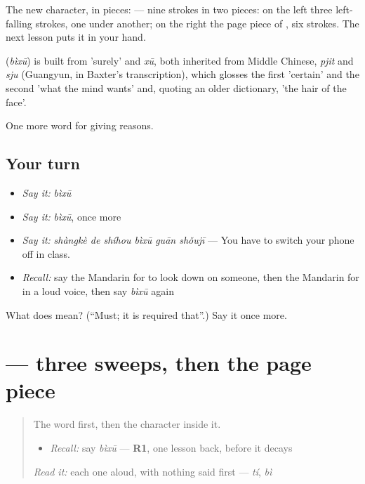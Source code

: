 The new character, in pieces:  — nine strokes in two pieces: on the left three left-falling strokes, one under another; on the right the page piece of , six strokes. The next lesson puts it in your hand.

\begin{cousinweb}
\textbf{} (\emph{bìxū}) is built from  'surely' and \emph{xū}, both inherited from Middle Chinese, \emph{pjit} and \emph{sju} (Guangyun, in Baxter's transcription), which glosses the first 'certain' and the second 'what the mind wants' and, quoting an older dictionary, 'the hair of the face'.
\end{cousinweb}

\begin{grammarlens}[title={What you've built}]
One more word for giving reasons.
\end{grammarlens}

\subsection*{Your turn}
\begin{itemize}
\raggedright
  \item \emph{Say it:} \emph{bìxū}
  \item \emph{Say it:} \emph{bìxū}, once more
  \item \emph{Say it:} \emph{shàngkè de shíhou bìxū guān shǒujī} — You have to switch your phone off in class.
  \item \emph{Recall:} say the Mandarin for to look down on someone, then the Mandarin for in a loud voice, then say \emph{bìxū} again
\end{itemize}

\begin{tcolorbox}[breakable,colback=teal!4,colframe=teal!35!black,title={Before you move on}]
What does  mean? (\textquotedblleft{}Must; it is required that\textquotedblright{}.) Say it once more.
\end{tcolorbox}
\section[\texorpdfstring{\zh{须} (xū)}{须 (xū)}]{ — three sweeps, then the page piece}

\label{lesson:ZH-W362-xu-must}



\begin{quote}
The word first, then the character inside it.

\begin{itemize}
\raggedright
  \item \emph{Recall:} say \emph{bìxū} — \textbf{R1}, one lesson back, before it decays
\end{itemize}

\begin{quote}
 
\end{quote}

\emph{Read it:} each one aloud, with nothing said first — \emph{tí}, \emph{bì}
\end{quote}

